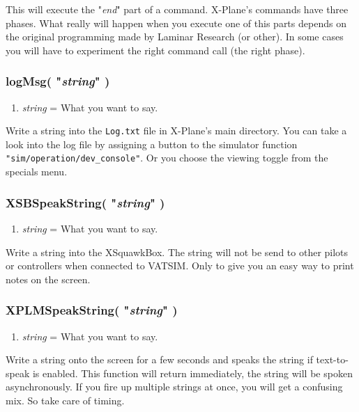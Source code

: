 \documentclass[11pt,parskip=half,a4paper]{scrartcl}
\begin{document}
This will execute the "\emph{end}" part of a command. X-Plane's commands have three phases. What really will happen when you execute one of this parts depends on the original programming made by Laminar Research  (or other). In some cases you will have to experiment the right command call (the right phase).

\subsubsection{logMsg( "\emph{string}" )}

\begin{enumerate}
	\item \emph{string} = What you want to say.
\end{enumerate}

Write a string into the \verb|Log.txt| file in X-Plane's main directory. You can take a look into the log file by assigning a button to the simulator function \verb|"sim/operation/dev_console"|. Or you choose the viewing toggle from the specials menu.

\subsubsection{XSBSpeakString( "\emph{string}" )}

\begin{enumerate}
	\item \emph{string} = What you want to say.
\end{enumerate}

Write a string into the XSquawkBox. The string will not be send to other pilots or controllers when connected to VATSIM. Only to give you an easy way to print notes on the screen.

\subsubsection{XPLMSpeakString( "\emph{string}" )}

\begin{enumerate}
	\item \emph{string} = What you want to say.
\end{enumerate}

Write a string onto the screen for a few seconds and speaks the string if text-to-speak is enabled. This function will return immediately, the string will be spoken asynchronously. If you fire up multiple strings at once, you will get a confusing mix. So take care of timing.
\end{document}
